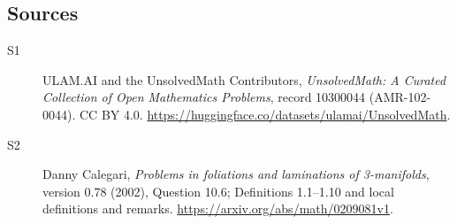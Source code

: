 \documentclass[11pt]{article}
\begin{document}
\subsection{Sources}
\begin{description}
\item[\hypertarget{source:10300044:1}{S1}] ULAM.AI and the UnsolvedMath Contributors, \emph{UnsolvedMath: A Curated Collection of Open Mathematics Problems}, record 10300044 (AMR-102-0044). CC BY 4.0. \url{https://huggingface.co/datasets/ulamai/UnsolvedMath}.
\item[\hypertarget{source:10300044:2}{S2}] Danny Calegari, \emph{Problems in foliations and laminations of 3-manifolds}, version 0.78 (2002), Question 10.6; Definitions 1.1--1.10 and local definitions and remarks. \url{https://arxiv.org/abs/math/0209081v1}.
\end{description}
\label{end:10300044}
\end{document}
